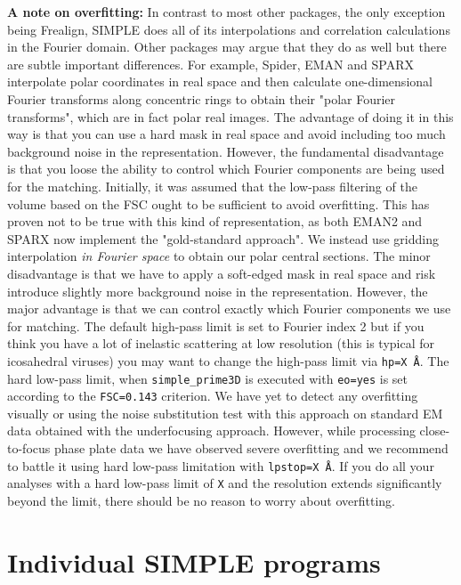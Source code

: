 \documentclass[a4paper,11pt]{article}
\newcommand{\prgname}[1]{\textcolor{NavyBlue}{\texttt{#1}}}
\begin{document}
\textbf{A note on overfitting:} In contrast to most other packages, the only exception being Frealign, SIMPLE does all of its interpolations and correlation calculations in the Fourier domain. Other packages may argue that they do as well but there are subtle important differences. For example, Spider, EMAN and SPARX interpolate polar coordinates in real space and then calculate one-dimensional Fourier transforms along concentric rings to obtain their "polar Fourier transforms", which are in fact polar real images. The advantage of doing it in this way is that you can use a hard mask in real space and avoid including too much background noise in the representation. However, the fundamental disadvantage is that you loose the ability to control which Fourier components are being used for the matching. Initially, it was assumed that the low-pass filtering of the volume based on the FSC ought to be sufficient to avoid overfitting. This has proven not to be true with this kind of representation, as both EMAN2 and SPARX now implement the "gold-standard approach". We instead use gridding interpolation \textit{in Fourier space} to obtain our polar central sections. The minor disadvantage is that we have to apply a soft-edged mask in real space and risk introduce slightly more background noise in the representation. However, the major advantage is that we can control exactly which Fourier components we use for matching. The default high-pass limit is set to Fourier index 2 but if you think you have a lot of inelastic scattering at low resolution (this is typical for icosahedral viruses) you may want to change the high-pass limit via \texttt{hp=X \AA{}}. The hard low-pass limit, when \prgname{simple\_prime3D} is executed with \texttt{eo=yes} is set according to the \texttt{FSC=0.143} criterion. We have yet to detect any overfitting visually or using the noise substitution test \citep{Chen:2013aa} with this approach on standard EM data obtained with the underfocusing approach. However, while processing close-to-focus phase plate data we have observed severe overfitting and we recommend to battle it using hard low-pass limitation with \texttt{lpstop=X \AA{}}. If you do all your analyses with a hard  low-pass limit of \texttt{X} and the resolution extends significantly beyond the limit, there should be no reason to worry about overfitting.

\section{Individual SIMPLE programs}
\end{document}
